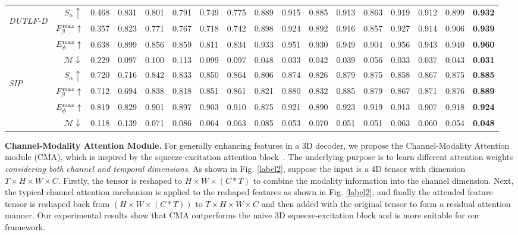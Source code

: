 \documentclass[letterpaper]{article}
\begin{document}
\begin{table*}[t!]
\begin{tabular}{lr|cccccccccccccc||c}
		\midrule
\multirow{4}{*}{\begin{sideways}\textit{DUTLF-D}\end{sideways}}
& $S_{\alpha}\uparrow$ &0.468 &0.831 &0.801 &0.791 &0.749 &0.775 &0.889 &0.915 &0.885 &0.913 &0.863 &0.919 &0.912 &0.899 &\bf{0.932}\\
		& $F_{\beta}^{\rm max}\uparrow$ &0.357  &0.823 &0.771 &0.767 &0.718 &0.742 &0.898 &0.924 &0.892 &0.916 &0.857 &0.927 &0.914 & 0.906 &\bf{0.939}\\
		& $E_{\phi}^{\rm max}\uparrow$ &0.638 &0.899 &0.856 &0.859 &0.811 &0.834 &0.933 &0.951 &0.930 &0.949 &0.904 &0.956 &0.943 &0.940 &\bf{0.960}\\
		& $\mathcal{M}\downarrow$ &0.229 &0.097 &0.100  &0.113 &0.099 &0.097 &0.048 &0.033 &0.042 &0.039 &0.056 &0.033 &0.037 &0.043 &\bf{0.031}\\
		\midrule
		
\multirow{4}{*}{\begin{sideways}\textit{SIP}\end{sideways}}
& $S_{\alpha}\uparrow$ & 0.720 & 0.716 & 0.842 & 0.833 &0.850 & 0.864 & 0.806 &0.874 &0.826 & 0.879 &0.875 &0.858 &0.867 &0.875  &\bf{0.885} \\
		& $F_{\beta}^{\rm max}\uparrow$ & 0.712 & 0.694 & 0.838 & 0.818 &0.851 & 0.861 & 0.821 &0.880  &0.832 & 0.885 &0.879 &0.867 &0.871  &0.876  &\bf{0.889} \\
		& $E_{\phi}^{\rm max}\uparrow$ & 0.819 & 0.829 & 0.901 & 0.897 &0.903 & 0.910 & 0.875 &0.921 &0.890 &0.923 &0.919 &0.913 &0.907 &0.918  &\bf{0.924}\\
		& $\mathcal{M}\downarrow$  & 0.118 & 0.139 & 0.071 & 0.086 &0.064 & 0.063 & 0.085 &0.053 &0.070 &0.051 &0.051 &0.063 &0.060 &0.054  &\bf{0.048}\\
		\bottomrule
		\hline
	\end{tabular}
	\vspace{-8pt}
\end{table*}

\noindent \textbf{Channel-Modality Attention Module.} For generally enhancing features in a 3D decoder, we propose the Channel-Modality Attention module (CMA), which is inspired by  the squeeze-excitation attention block~\cite{hu2018squeeze}. The underlying purpose is to learn different attention weights \emph{considering both channel and temporal dimensions}. As shown in Fig. \ref{label2}, suppose the input is a 4D tensor with dimension $T\times H\times W\times C$. Firstly, the tensor is reshaped to $H\times W \times (C*T)$ to combine the modality information into the channel dimension. Next, the typical channel attention mechanism \cite{hu2018squeeze} is applied to the reshaped features as shown in Fig. \ref{label2}, and finally the attended feature tensor is reshaped back from $(H\times W \times (C*T))$ to $T\times H\times W\times C$ and then added with the original tensor to form a residual attention manner. Our experimental results show that CMA outperforms the naive 3D squeeze-excitation block and is more suitable for our framework.
\end{document}
